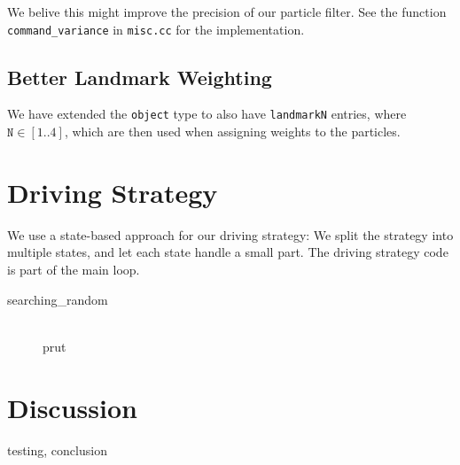 \documentclass[a4paper,12pt]{article}
\begin{document}
We belive this might improve the precision of our particle filter.  See the
function \texttt{command_variance} in \texttt{misc.cc} for the implementation.


\subsection{Better Landmark Weighting}

We have extended the \texttt{object} type to also have \texttt{landmarkN}
entries, where $\texttt{N} \in [1..4]$, which are then used when assigning
weights to the particles.


\newpage
\section{Driving Strategy}

We use a state-based approach for our driving strategy: We split the strategy
into multiple states, and let each state handle a small part.  The driving
strategy code is part of the main loop.

\begin{description}
\item[searching_random]\hfill\\
prut\end{description}


\newpage
\section{Discussion}

testing, conclusion
\end{document}
